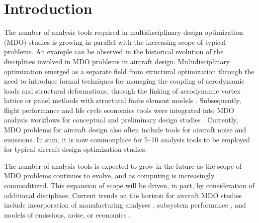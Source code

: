 \section{Introduction}
    \label{s:intro}
    The number of analysis tools required in multidisciplinary design optimization (MDO) studies is growing
    in parallel with the increasing scope of typical problems. An example can
    be observed in the historical evolution of the disciplines involved in MDO problems in aircraft design.
    Multidisciplinary optimization emerged as a separate field from structural optimization through the
    need to introduce formal techniques for managing the coupling of aerodynamic loads and structural
    deformations, through the linking of aerodynamic vortex lattice or panel methods with structural finite
    element models \cite{Cramer1994}. Subsequently, flight performance and life cycle economics tools were integrated
    into MDO analysis workflows for conceptual and preliminary design studies \cite{Sobieski1998}. Currently, MDO
    problems for aircraft design also often include tools for aircraft noise and emissions. In sum, it is now
    commonplace for 5--10 analysis tools to be employed for typical aircraft design optimization studies.
    
    The number of analysis tools is expected to grow in the future as the scope of MDO problems continues
    to evolve, and as computing is increasingly commoditized. This expansion of scope will be driven, in
    part, by consideration of additional disciplines. Current trends on the horizon for aircraft MDO studies
    include incorporation of manufacturing analyses \cite{deWeck2007}, subsystem performance \cite{Dean2009,Gavel2006}, and models of emissions, noise, or economics \cite{Antoine2004,Rallabhandi2007,Kirby2008}.

